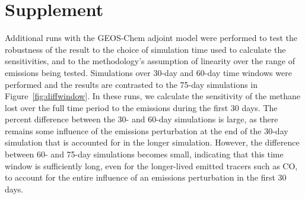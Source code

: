 \section{Supplement}

Additional runs with the GEOS-Chem adjoint model were performed to test the robustness of the result to the choice of simulation time used to calculate the sensitivities, and to the methodology's assumption of linearity over the range of emissions being tested. Simulations over 30-day and 60-day time windows were performed and the results are contrasted to the 75-day simulations in Figure~\ref{fig:diffwindow}. In these runs, we calculate the sensitivity of the methane lost over the full time period to the emissions during the first 30 days. The percent difference between the 30- and 60-day simulations is large, as there remains some influence of the emissions perturbation at the end of the 30-day simulation that is accounted for in the longer simulation. However, the difference between 60- and 75-day simulations becomes small, indicating that this time window is sufficiently long, even for the longer-lived emitted tracers such as CO, to account for the entire influence of an emissions perturbation in the first 30 days.
